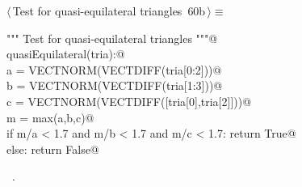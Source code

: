 \documentclass[11pt,oneside]{article}    %
\begin{document}
\begin{flushleft} \small \label{scrap114}
\protect{}$\langle\,$Test for quasi-equilateral triangles\nobreak\ {\footnotesize 60b}$\,\rangle\equiv$
\vspace{-1ex}
\begin{list}{}{} \item
\mbox{}\verb@""" Test for quasi-equilateral triangles """@\\
\mbox{}\verb@def quasiEquilateral(tria):@\\
\mbox{}\verb@    a = VECTNORM(VECTDIFF(tria[0:2]))@\\
\mbox{}\verb@    b = VECTNORM(VECTDIFF(tria[1:3]))@\\
\mbox{}\verb@    c = VECTNORM(VECTDIFF([tria[0],tria[2]]))@\\
\mbox{}\verb@    m = max(a,b,c)@\\
\mbox{}\verb@    if m/a < 1.7 and m/b < 1.7 and m/c < 1.7: return True@\\
\mbox{}\verb@    else: return False@\\
\mbox{}\verb@@{\NWsep}
\end{list}
\vspace{-1ex}
\footnotesize\addtolength{\baselineskip}{-1ex}
\begin{list}{}{\setlength{\itemsep}{-\parsep}\setlength{\itemindent}{-\leftmargin}}
\item \NWtxtMacroRefIn\ .
\end{list}
\end{flushleft}
\end{document}
